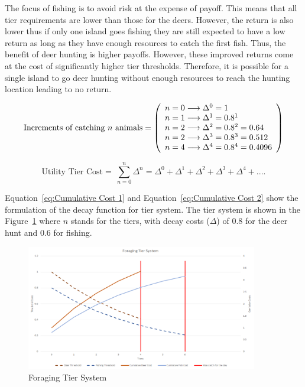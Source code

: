 The focus of fishing is to avoid risk at the expense of payoff. This means that all tier requirements are lower than those for the deers. However, the return is also lower thus if only one island goes fishing they are still expected to have a low return as long as they have enough resources to catch the first fish. Thus, the benefit of deer hunting is higher payoffs. However, these improved returns come at the cost of significantly higher tier thresholds. Therefore, it is possible for a single island to go deer hunting without enough resources to reach the hunting location leading to no return.

\begin{equation}
\text{Increments of catching $n$ animals}=
\left( \begin{array}{ll@{}}
n=0 \longrightarrow \Delta^0 = 1 \\
n=1 \longrightarrow \Delta^1 = 0.8^1 \\
n=2 \longrightarrow \Delta^2 = 0.8^2 = 0.64 \\
n=2 \longrightarrow \Delta^3 = 0.8^3 = 0.512 \\
n=4 \longrightarrow \Delta^4 = 0.8^4 = 0.4096\\
\end{array} \right) 
\label{eq:Cumulative Cost 1}
\end{equation}

\begin{equation}
\text{Utility Tier Cost}=\ \sum_{n=0}^{n} \Delta^{n} = \Delta^{0} + \Delta^{1} + \Delta^{2} + \Delta^{3} + \Delta^{4} + ....
\label{eq:Cumulative Cost 2}
\end{equation}

Equation~\eqref{eq:Cumulative Cost 1} and Equation~\eqref{eq:Cumulative Cost 2} show the formulation of the decay function for tier system. The tier system is shown in the Figure~\ref{fig:Foraging Tier System} where $n$ stands for the tiers, with decay costs ($\Delta$) of $0.8$ for the deer hunt and $0.6$ for fishing.

\begin{figure}[!htb]
    \centering
    \includegraphics[width=0.9\textwidth]{04_environment/images/Foraging Tier System.PNG}
    \caption{Foraging Tier System}
    \label{fig:Foraging Tier System}
\end{figure}

